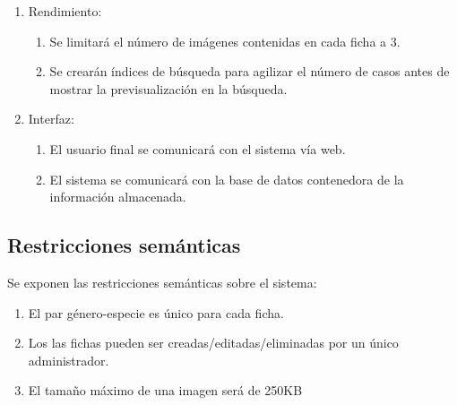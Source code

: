\documentclass[10pt,a4paper]{article}
\begin{document}
\begin{enumerate}[label=RNF\arabic*. ,leftmargin=3.2\parindent]
	
	\item Rendimiento:
		\begin{enumerate}[label=-]
			\item Se limitará el número de imágenes contenidas en cada ficha a 3.
			\item Se crearán índices de búsqueda para agilizar el número de casos antes de mostrar la previsualización en la búsqueda.
		    
		\end{enumerate}
		
	\item Interfaz:
		\begin{enumerate}[label=-]
			\item El usuario final se comunicará con el sistema vía web.
			\item El sistema se comunicará con la base de datos contenedora de la información almacenada.
		\end{enumerate}
	
\end{enumerate}

\subsection{\textbf{Restricciones semánticas}}

Se exponen las restricciones semánticas sobre el sistema:
\newline

\begin{enumerate}[label=RS\arabic*. ,leftmargin=2.8\parindent]
	
	\item El par género-especie es único para cada ficha.
	\item Los las fichas pueden ser creadas/editadas/eliminadas por un único administrador.
	\item El tamaño máximo de una imagen será de 250KB
	
\end{enumerate}
\end{document}
